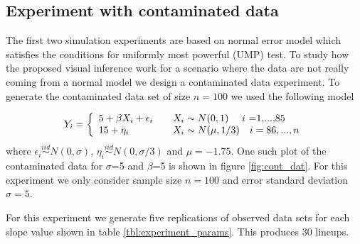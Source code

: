 \documentclass{article}
\begin{document}
\subsection{Experiment with contaminated data}

The first two simulation experiments are based on normal error model which satisfies the conditions for uniformly most powerful (UMP) test. To study how the proposed visual inference work for a scenario where the data are not really coming from a normal model we design a contaminated data experiment. To generate the contaminated data set of size $n=100$ we used the following model


\[
  Y_i = \left\{
  \begin{array}{l l}
    5+\beta X_i + \epsilon_i  & \quad  X_i \sim N(0,1) \quad \text{ $i$ =1,...,85}\\
    15+ \eta_i & \quad X_i \sim N(\mu,1/3) \quad  i=86,...,n\\
  \end{array} \right.
\]
where $\epsilon_i \stackrel{iid}\sim N(0,\sigma)$, $\eta_i \stackrel{iid}\sim N(0,\sigma/3)$ and $\mu = -1.75$. One such plot of the contaminated data for $\sigma$=5 and $\beta$=5 is shown in figure \ref{fig:cont_dat}. For this experiment we only consider sample size $n=100$ and error standard deviation $\sigma=5$.

For this experiment we generate five replications of observed data sets for each slope value shown in table \ref{tbl:experiment_params}. This produces 30 lineups.
\end{document}
